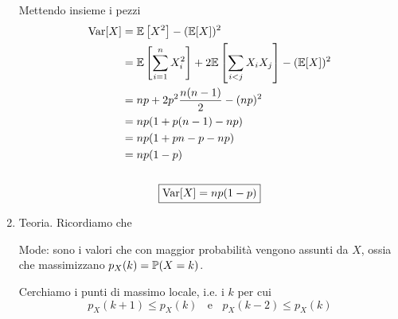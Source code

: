 \begin{enumerate}


Mettendo insieme i pezzi\begin{gather*}
\begin{aligned}
\mathrm{Var}[ X] & =\mathbb{E}\left[ X^{2}\right] -(\mathbb{E}[ X])^{2}\\
 & =\mathbb{E}\left[\sum\limits _{i=1}^{n} X_{i}^{2}\right] +2\mathbb{E}\left[\sum\limits _{i< j} X_{i} X_{j}\right] -(\mathbb{E}[ X])^{2}\\
 & =np+2p^{2}\frac{n( n-1)}{2} -( np)^{2}\\
 & =np( 1+p( n-1) -np)\\
 & =np( 1+pn-p-np)\\
 & =np( 1-p)
\end{aligned}\\
\\
\boxed{\mathrm{Var}[ X] =np( 1-p)}
\end{gather*}
\item Teoria. Ricordiamo che

Mode: sono i valori che con maggior probabilità vengono assunti da $X$, ossia che massimizzano $p_{X}( k) =\mathbb{P}( X=k)$.

Cerchiamo i punti di massimo locale, i.e. i $k$ per cui\begin{equation*}
\boxed{p_{X}( k+1) \leq p_{X}( k) \ \ \ \ \text{e} \ \ \ \ p_{X}( k-2) \leq p_{X}( k)}
\end{equation*}


\end{enumerate}
